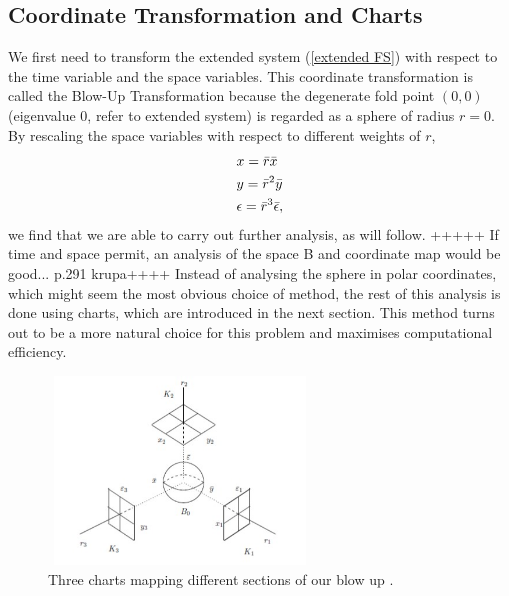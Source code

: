 \subsection{Coordinate Transformation and Charts} \label{sec:transform blowup}
We first need to transform the extended system (\ref{extended FS}) with respect to the time variable and the space variables. This coordinate transformation is called the Blow-Up Transformation because the degenerate fold point $(0,0)$ (eigenvalue 0, refer to extended system) is regarded as a sphere of radius $r=0$. By rescaling the space variables with respect to different weights of $r$,
\begin{subequations}
    \begin{align}
        &x=\Bar{r}\Bar{x}  \label{sys: blow up trans x}\\
        &y=\Bar{r}^2\Bar{y} \label{sys: blow up trans y}\\ 
        &\epsilon=\bar{r}^3\bar{\epsilon} \label{sys: blow up trans z},
    \end{align}  
    \label{sys: blow up trans}
\end{subequations}
we find that we are able to carry out further analysis, as will follow.
+++++ If time and space permit, an analysis of the space B and coordinate map would be good... p.291 krupa++++
Instead of analysing the sphere in polar coordinates, which might seem the most obvious choice of method,  the rest of this analysis is done using charts, which are introduced in the next section. This method turns out to be a more natural choice for this problem and maximises computational efficiency.
\begin{figure}[h!]
	\centering
	\includegraphics[height=5cm,width=7cm]{Images/charts-ball}
	\caption{Three charts mapping different sections of our blow up \citep{krupa2001}.}
	\label{fig:chartDiagram}
\end{figure}
